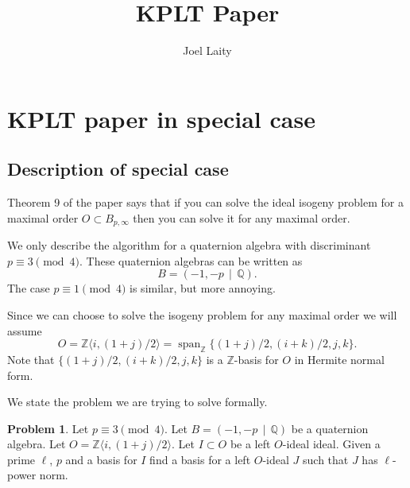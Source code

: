 \documentclass[10pt]{article}
\title{KPLT Paper}
\author{Joel Laity}
\theoremstyle{plain}
\theoremstyle{definition}
\newtheorem{prob}[theorem]{Problem}
\newcommand{\op}{\operatorname}
\newcommand{\Z}{\mathbb{Z}}
\newcommand{\Q}{\mathbb{Q}}
\begin{document}
\maketitle
\tableofcontents


\section{KPLT paper in special case}
\subsection{Description of special case}

Theorem 9 of the paper says that if you can solve the ideal isogeny problem for a maximal order \( O \subset B_{p, \infty} \) then you can solve it for any  maximal order.


We only describe the algorithm for a quaternion algebra with discriminant \( p \equiv 3 \pmod{4} \).
These quaternion algebras can be written as
\[
    B = (-1, -p \, \mid \, \Q).
\]
The case \( p \equiv 1 \pmod{4} \) is similar, but more annoying.

Since we can choose to solve the isogeny problem for any maximal order we will assume
\[
    O = \Z \langle i, (1+j) / 2 \rangle = \op{span}_\Z \{ (1+j) / 2, (i+k) / 2 , j, k \}.
\]
Note that \( \{ (1+j) / 2, (i+k) / 2 , j, k \} \) is a \( \Z \)-basis for \( O \) in Hermite normal form.

We state the problem we are trying to solve formally.

\begin{prob} \label{prob: general}
    Let \( p \equiv 3 \pmod{4} \).
    Let \( B =  (-1, -p \, \mid \, \Q) \) be a quaternion algebra.
    Let \( O = \Z \langle i, (1+j) / 2 \rangle \).
    Let \( I \subset O \) be a left \( O \)-ideal ideal.
    Given a prime \( \ell \), \( p \) and a basis for \( I \) find a basis for a left \( O \)-ideal \( J \) such that \( J \) has \( \ell \)-power norm.
\end{prob}
\end{document}
